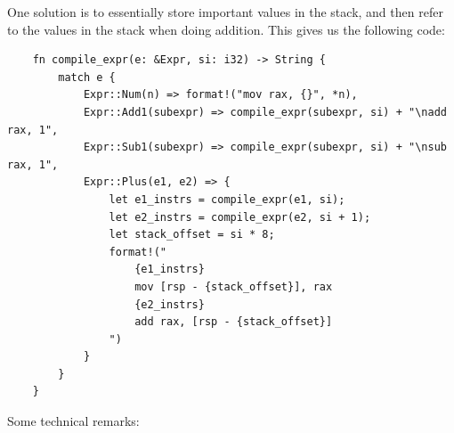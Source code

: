 One solution is to essentially store important values in the stack, and then refer to the values in the stack when doing addition. This gives us the following code: 
\begin{verbatim}
    fn compile_expr(e: &Expr, si: i32) -> String {
        match e {
            Expr::Num(n) => format!("mov rax, {}", *n),
            Expr::Add1(subexpr) => compile_expr(subexpr, si) + "\nadd rax, 1",
            Expr::Sub1(subexpr) => compile_expr(subexpr, si) + "\nsub rax, 1",
            Expr::Plus(e1, e2) => {
                let e1_instrs = compile_expr(e1, si);
                let e2_instrs = compile_expr(e2, si + 1);
                let stack_offset = si * 8;
                format!("
                    {e1_instrs}
                    mov [rsp - {stack_offset}], rax
                    {e2_instrs}
                    add rax, [rsp - {stack_offset}]
                ")
            }
        }
    }\end{verbatim}
Some technical remarks: 
